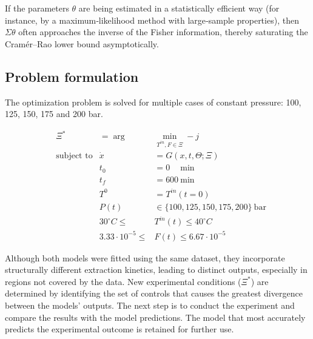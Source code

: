 \documentclass[../Article_Design_of_Experiment.tex]{subfiles}
\begin{document}
	If the parameters $\theta$ are being estimated in a statistically efficient way (for instance, by a maximum‐likelihood method with large‐sample properties), then $\Sigma \theta$ often approaches the inverse of the Fisher information, thereby saturating the Cramér–Rao lower bound asymptotically.
		
	\subsection{Problem formulation}
	The optimization problem is solved for multiple cases of constant pressure: 100, 125, 150, 175 and 200 bar.
	
	{\footnotesize
		\begin{equation}
			\begin{aligned} 
				&\Xi^* &= \arg &\min_{ T^{in}, F \in \Xi} -j  \\
				&\text{subject to}
				& \dot{x} &= G(x,t,\Theta;\Xi) \\
				&& t_0&=0\quad~\text{min} \\
				&& t_f&=600~\text{min} \\
				&& T^{0} &= T^{in}(t=0) \\
				&& P(t) & \in \{100, 125, 150, 175, 200\}~\text{bar} \\
				&& 30^\circ C \leq &T^{in}(t) \leq 40^\circ C \\
				&& 3.33 \cdot 10^{-5} \leq &F(t) \leq 6.67 \cdot 10^{-5}
			\end{aligned} \label{EQ:Formulation}
	\end{equation} }
	
	Although both models were fitted using the same dataset, they incorporate structurally different extraction kinetics, leading to distinct outputs, especially in regions not covered by the data. New experimental conditions ($\Xi^*$) are determined by identifying the set of controls that causes the greatest divergence between the models’ outputs. The next step is to conduct the experiment and compare the results with the model predictions. The model that most accurately predicts the experimental outcome is retained for further use. 
	
\end{document}
